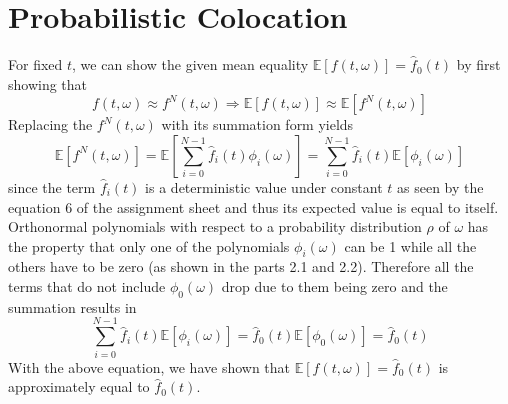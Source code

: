 \documentclass{article}
\begin{document}
\section{Probabilistic Colocation}
For fixed $t$, we can show the given mean equality $\mathbb{E}[f(t,\omega)] = \hat{f}_0(t)$ by first showing that 
\begin{equation}\label{eq:f_to_n}
    f(t,\omega) \approx f^N(t,\omega) \Rightarrow \mathbb{E}[f(t,\omega)] \approx \mathbb{E}[f^N(t,\omega)]
\end{equation}
Replacing the $f^N(t,\omega)$ with its summation form yields
\begin{equation}
    \mathbb{E}[f^N(t,\omega)] = \mathbb{E}\left[\sum_{i=0}^{N-1}\hat{f}_i(t)\phi_i(\omega)\right] = \sum_{i=0}^{N-1}\hat{f}_i(t)\mathbb{E}\left[\phi_i(\omega)\right]
\end{equation}
since the term $\hat{f}_i(t)$ is a deterministic value under constant $t$ as seen by the equation 6 of the assignment 
sheet and thus its expected value is equal to itself. Orthonormal polynomials with respect to a 
probability distribution $\rho$ of $\omega$ has the property that only one of the polynomials $\phi_i(\omega)$ can be
1 while all the others have to be zero (as shown in the parts 2.1 and 2.2). Therefore all the terms that do not include
$\phi_0(\omega)$ drop due to them being zero and the summation results in
\begin{equation}
    \sum_{i=0}^{N-1}\hat{f}_i(t)\mathbb{E}\left[\phi_i(\omega)\right] = \hat{f}_0(t)\mathbb{E}\left[\phi_0(\omega)\right] = \hat{f}_0(t)
\end{equation}
With the above equation, we have shown that $\mathbb{E}[f(t,\omega)] = \hat{f}_0(t)$ is approximately equal to $\hat{f}_0(t)$.
\end{document}

